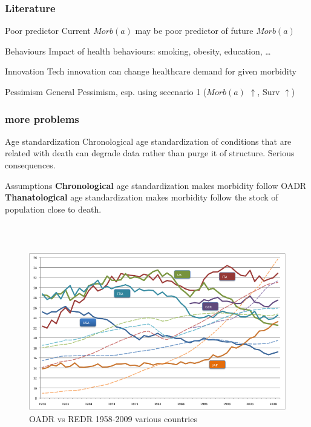 \documentclass[20pt]{beamer}
\begin{document}
\begin{frame}%
\frametitle{Literature}

\begin{block}{Poor predictor}
Current $Morb(a)$ may be poor predictor of future $Morb(a)$
\end{block}

\begin{block}{Behaviours}
Impact of health behaviours: smoking, obesity, education, \ldots
\end{block}

\begin{block}{Innovation}
Tech innovation can change healthcare demand for given morbidity
\end{block}

\begin{block}{Pessimism}
General Pessimism, esp. using secenario 1 ($Morb(a)$ $\uparrow$, Surv $\uparrow$)
\end{block}
\end{frame}	%
%
\begin{frame}
\frametitle{more problems}
\begin{block}{Age standardization}
Chronological age standardization of conditions that are related with death can
degrade data rather than purge it of structure. Serious consequences.
\end{block}
\begin{block}{Assumptions}
\textbf{Chronological} age standardization makes morbidity follow OADR
\textbf{Thanatological} age standardization makes morbidity follow
the stock of population close to death.\footnotemark
\end{block}
%
\end{frame}

\begin{frame}

\begin{figure}[b]
\frametitle{~}
    \centering
    \caption{OADR vs REDR 1958-2009 various countries}
    \includegraphics[scale=.9]{Figures/Johnsfig.png}
\end{figure} 
\end{frame}
\end{document}
